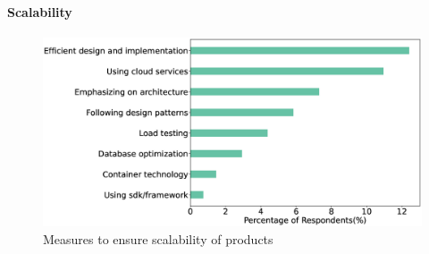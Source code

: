 \paragraph{Scalability}
\label{Scalability}
\begin{figure}[h]
\centering
\includegraphics[scale=0.22]{Figures/Scalability.eps} 
\caption{Measures to ensure scalability of products}
\label{fig:Measures to ensure scalability}
\end{figure}


